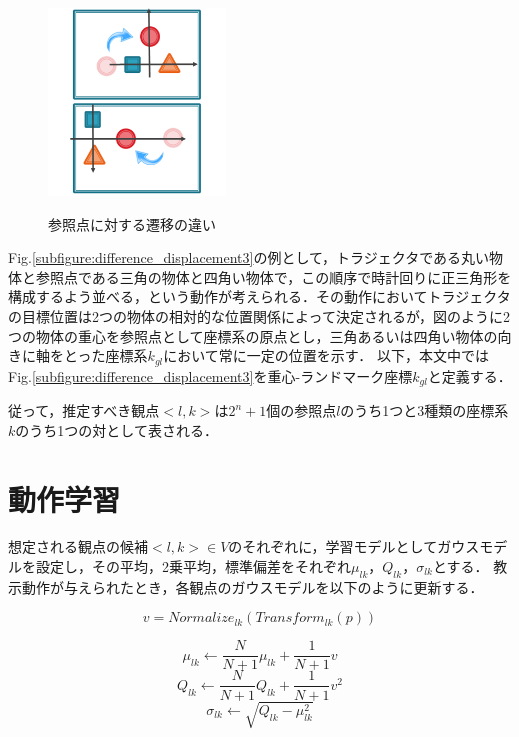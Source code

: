 \begin{figure}[h]
\begin{minipage}[t]{.3\textwidth}
		\centering
		\includegraphics[width=4.7cm]{figure2_sub_c.png} \\ %
		\label{subfigure:difference_displacement3}
	\end{minipage}
	\caption{参照点に対する遷移の違い}
	\label{figure:difference_displacement}
\end{figure}


Fig.\ref{subfigure:difference_displacement3}の例として，トラジェクタである丸い物体と参照点である三角の物体と四角い物体で，この順序で時計回りに正三角形を構成するよう並べる，という動作が考えられる．その動作においてトラジェクタの目標位置は2つの物体の相対的な位置関係によって決定されるが，図のように2つの物体の重心を参照点として座標系の原点とし，三角あるいは四角い物体の向きに軸をとった座標系$k_{gl}$において常に一定の位置を示す．
以下，本文中ではFig.\ref{subfigure:difference_displacement3}を重心-ランドマーク座標$k_{gl}$と定義する．

従って，推定すべき観点$<l , k>$は$2^{n}+1$個の参照点$l$のうち1つと3種類の座標系$k$のうち1つの対として表される．

\section{動作学習}

想定される観点の候補$<l , k>∈V$のそれぞれに，学習モデルとしてガウスモデルを設定し，その平均，2乗平均，標準偏差をそれぞれ$μ_{lk}$，$Q_{lk}$，$σ_{lk}$とする．
教示動作が与えられたとき，各観点のガウスモデルを以下のように更新する．

\begin{equation}
	v = Normalize_{lk}(Transform_{lk}(p))
\end{equation}

\begin{equation}
	μ_{lk}  \leftarrow \frac{N}{N+1}μ_{lk}+\frac{1}{N+1}v
\end{equation}
\begin{equation}
	Q_{lk}  \leftarrow \frac{N}{N+1}Q_{lk}+\frac{1}{N+1}v^2	
\end{equation}
\begin{equation}
	σ_{lk}  \leftarrow \sqrt{Q_{lk} - μ_{lk}^2}
\end{equation}

